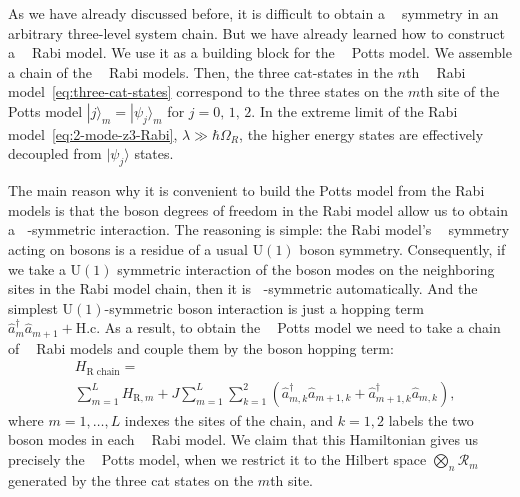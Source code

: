 \documentclass[reprint, aps, prx, amsmath, amssymb, longbibliography, superscriptaddress]{revtex4-2}
\DeclareMathOperator{\Zthree}{\mathbb{Z}_3}
\begin{document}
As we have already discussed before, it is difficult to obtain a $\Zthree$ symmetry in an arbitrary three-level system chain. But we have already learned how to construct a $\Zthree$ Rabi model. We use it as a building block for the $\Zthree$ Potts model. We assemble a chain of the $\Zthree$ Rabi models. Then, the three cat-states in the $n$th $\Zthree$ Rabi model~\eqref{eq:three-cat-states} correspond to the three states on the $m$th site of the Potts model $ |j\rangle_m = |\psi_j\rangle_m $ for $j=0,\, 1,\, 2$. In the extreme limit of the Rabi model~\eqref{eq:2-mode-z3-Rabi}, $ \lambda \gg \hbar \Omega_R$,  the higher energy states are effectively decoupled from $|\psi_j\rangle$ states.

The main reason why it is convenient to build the Potts model from the Rabi models is that the boson degrees of freedom in the Rabi model allow us to obtain a $\Zthree$-symmetric interaction. The reasoning is simple: the Rabi model's $\Zthree$ symmetry acting on bosons is a residue of a usual $\mathrm{U(1)}$ boson symmetry. Consequently, if we take a $\mathrm{U(1)}$ symmetric interaction of the boson modes on the neighboring sites in the Rabi model chain, then it is $\Zthree$-symmetric automatically. And the simplest $\mathrm{U(1)}$-symmetric boson interaction is just a hopping term $\hat a_m^{\dagger} \hat a_{m+1} + \textrm{H.c.}$ As a result, to obtain the $\Zthree$ Potts model we need to take a chain of $\Zthree$ Rabi models and couple them by the boson hopping term:
\begin{equation}
\label{eq:coupled-rabi}
\begin{aligned}
    &H_{\text{R chain}} = \\
    &\sum\limits_{m=1}^L H_{\text{R}, m} + J \sum\limits_{m=1}^L \sum\limits_{k=1}^2\left( \hat a_{m,k}^{\dagger} \hat a_{m+1,k} + \hat a_{m+1,k}^{\dagger} \hat a_{m,k}\right),
\end{aligned}
\end{equation}
where $m =1, \dots, L$ indexes the sites of the chain, and $k=1,2$ labels the two boson modes in each $ \Zthree $ Rabi model. We claim that this Hamiltonian gives us precisely the $\Zthree$ Potts model, when we restrict it to the Hilbert space $\bigotimes_n\mathcal{R}_m$ generated by the three cat states on the $m$th site.
\end{document}
